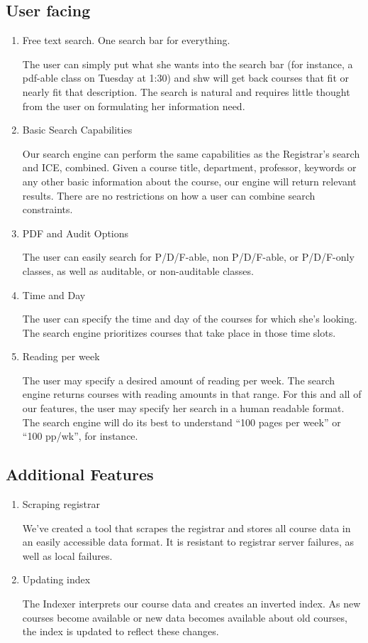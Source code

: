 \documentclass[12pt,letterpaper]{article}
\begin{document}
\subsection{User facing}
\begin{enumerate}
\item Free text search. One search bar for everything.
  
  The user can simply put what she wants into the search bar (for instance, a pdf-able class on Tuesday at 1:30) and shw will get back courses that fit or nearly fit that description. The search is natural and requires little thought from the user on formulating her information need. 
  
\item Basic Search Capabilities
  
  Our search engine can perform the same capabilities as the Registrar's search and ICE, combined. Given a course title, department, professor, keywords or any other basic information about the course, our engine will return relevant results. There are no restrictions on how a user can combine search constraints.
  
\item PDF and Audit Options
  
  The user can easily search for P/D/F-able, non P/D/F-able, or P/D/F-only classes, as well as auditable, or non-auditable classes.
  
\item Time and Day
			  
  The user can specify the time and day of the courses for which she's looking. The search engine prioritizes courses that take place in those time slots.
  
\item Reading per week
  
  The user may specify a desired amount of reading per week. The search engine returns courses with reading amounts in that range. For this and all of our features, the user may specify her search in a human readable format. The search engine will do its best to understand ``100 pages per week'' or ``100 pp/wk'', for instance.
  
\end{enumerate}

\subsection{Additional Features}
\begin{enumerate}
\item Scraping registrar
  
  We've created a tool that scrapes the registrar and stores all course data in an easily accessible data format. It is resistant to registrar server failures, as well as local failures.
			
\item Updating index
  
  The Indexer interprets our course data and creates an inverted index. As new courses become available or new data becomes available about old courses, the index is updated to reflect these changes.
  
\end{enumerate}
\end{document}
